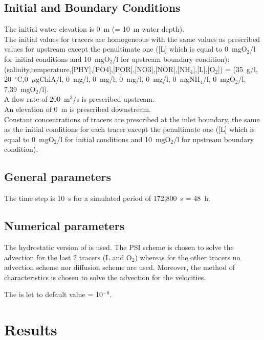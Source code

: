 \subsection{Initial and Boundary Conditions}

The initial water elevation is 0~m (= 10~m water depth).\\

The initial values for tracers are homogeneous
with the same values as prescribed values for upstream except the penultimate
one ([L] which is equal to 0~mgO$_2$/l for initial conditions and
10~mgO$_2$/l for upstream boundary condition):\\
(salinity,temperature,[PHY],[PO4],[POR],[NO3],[NOR],[NH$_4$],[L],[O$_2$]) =
(35~g/l, 20~$^\circ$C,0~$\mu$gChlA/l, 0~mg/l, 0~mg/l, 0~mg/l, 0~mg/l, 0~mgNH$_4$/l, 0~mgO$_2$/l, 7.39~mgO$_2$/l).\\
%
A flow rate of 200~m$^3$/s is prescribed upstream.\\
An elevation of 0~m is prescribed downstream.\\
Constant concentrations of tracers are prescribed at the inlet boundary,
the same as the initial conditions for each tracer
except the penultimate one ([L] which is equal to 0~mgO$_2$/l for initial
conditions and 10~mgO$_2$/l for upstream boundary condition).

\subsection{General parameters}

The time step is 10~s for a simulated period of 172,800~s = 48~h.

\subsection{Numerical parameters}

The hydrostatic version of  is used.
The PSI scheme is chosen to solve the advection for the last 2 tracers
(L and O$_2$) whereas for the other tracers no advection scheme nor diffusion
scheme are used.
Moreover, the method of characteristics is chosen to solve the advection for
the velocities.

The  is let to default value =
10$^{-8}$.

\section{Results}

